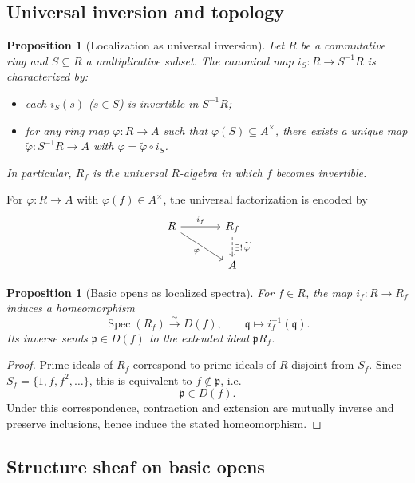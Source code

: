 \documentclass[12pt, a4paper]{article}
\newtheorem{proposition}[theorem]{Proposition}
\theoremstyle{definition}
\DeclareMathOperator{\Spec}{Spec}
\begin{document}
\subsection{Universal inversion and topology}

\begin{proposition}[Localization as universal inversion]
Let $R$ be a commutative ring and $S\subseteq R$ a multiplicative subset. The canonical map $i_S:R\to S^{-1}R$ is characterized by:
\begin{itemize}[leftmargin=2em]
    \item each $i_S(s)$ ($s\in S$) is invertible in $S^{-1}R$;
    \item for any ring map $\varphi:R\to A$ such that $\varphi(S)\subseteq A^\times$, there exists a unique map $\widetilde\varphi:S^{-1}R\to A$ with $\varphi=\widetilde\varphi\circ i_S$.
\end{itemize}
In particular, $R_f$ is the universal $R$-algebra in which $f$ becomes invertible.
\end{proposition}

For $\varphi:R\to A$ with $\varphi(f)\in A^\times$, the universal factorization is encoded by
\[
\begin{tikzcd}[column sep=large]
R \arrow[r, "i_f"] \arrow[dr, "\varphi"'] & R_f \arrow[d, dashed, "\exists!\,\widetilde\varphi"] \\
& A
\end{tikzcd}
\]

\begin{proposition}[Basic opens as localized spectra]
For $f\in R$, the map $i_f:R\to R_f$ induces a homeomorphism
\[
\Spec(R_f)\xrightarrow{\sim} D(f),
\qquad
\mathfrak q\longmapsto i_f^{-1}(\mathfrak q).
\]
Its inverse sends $\mathfrak p\in D(f)$ to the extended ideal $\mathfrak pR_f$.
\end{proposition}

\begin{proof}
Prime ideals of $R_f$ correspond to prime ideals of $R$ disjoint from $S_f$. Since $S_f=\{1,f,f^2,\dots\}$, this is equivalent to $f\notin\mathfrak p$, i.e.
\[
\mathfrak p\in D(f).
\]
Under this correspondence, contraction and extension are mutually inverse and preserve inclusions, hence induce the stated homeomorphism.
\end{proof}

\subsection{Structure sheaf on basic opens}
\end{document}
